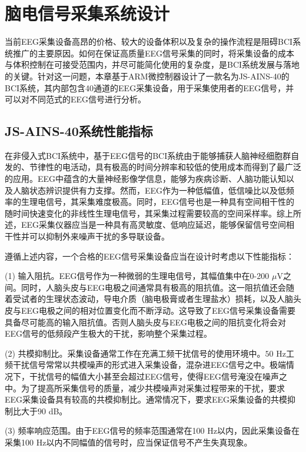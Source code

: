 
\chapter{脑电信号采集系统设计}

当前EEG采集设备高昂的价格、较大的设备体积以及复杂的操作流程是阻碍BCI系统推广的主要原因。如何在保证高质量EEG信号采集的同时，将采集设备的成本与体积控制在可接受范围内，并尽可能简化使用的复杂度，是BCI系统发展与落地的关键。针对这一问题，本章基于ARM微控制器设计了一款名为JS-AINS-40的BCI系统，其内部包含40通道的EEG采集设备，用于采集使用者的EEG信号，并可以对不同范式的EEG信号进行分析。

\section{JS-AINS-40系统性能指标}

在非侵入式BCI系统中，基于EEG信号的BCI系统由于能够捕获人脑神经细胞群自发的、节律性的电活动，具有极高的时间分辨率和较低的使用成本而得到了最广泛的应用。EEG中蕴含的大量神经影像学信息，能够为疾病诊断、人脑功能认知以及人脑状态辨识提供有力支撑。然而，EEG作为一种低幅值，低信噪比以及低频率的生理电信号，其采集难度极高。同时，EEG信号也是一种具有空间相干性的随时间快速变化的非线性生理电信号，其采集过程需要较高的空间采样率\cite{2-1}。综上所述，EEG采集仪器应当是一种具有高灵敏度、低响应延迟，能够保留信号空间相干性并可以抑制外来噪声干扰的多导联设备\cite{2-2}。

遵循上述内容，一个合格的EEG信号采集设备应当在设计时考虑以下性能指标\cite{2-3}：

(1) 输入阻抗。EEG信号作为一种微弱的生理电信号，其幅值集中在0-200 $\mu$V之间。同时，人脑头皮与EEG电极之间通常具有极高的阻抗值。这一阻抗值还会随着受试者的生理状态波动，导电介质（脑电极膏或者生理盐水）损耗，以及人脑头皮与EEG电极之间的相对位置变化而不断浮动。这导致了EEG信号采集设备需要具备尽可能高的输入阻抗值。否则人脑头皮与EEG电极之间的阻抗变化将会对EEG信号的低频段产生极大的干扰，影响整个采集过程。

(2) 共模抑制比。采集设备通常工作在充满工频干扰信号的使用环境中。$50$ Hz工频干扰信号常常以共模噪声的形式进入采集设备，混杂进EEG信号之中。极端情况下，干扰信号的幅值大小甚至会超过EEG信号，使得EEG信号淹没在噪声之中。为了提高所采集信号的质量，减少共模噪声对采集过程带来的干扰，要求EEG采集设备具有较高的共模抑制比。通常情况下，要求EEG采集设备的共模抑制比大于$90$ dB。

(3) 频率响应范围。由于EEG信号的频率范围通常在100 Hz以内，因此采集设备在采集100 Hz以内不同幅值的信号时，应当保证信号不产生失真现象。

